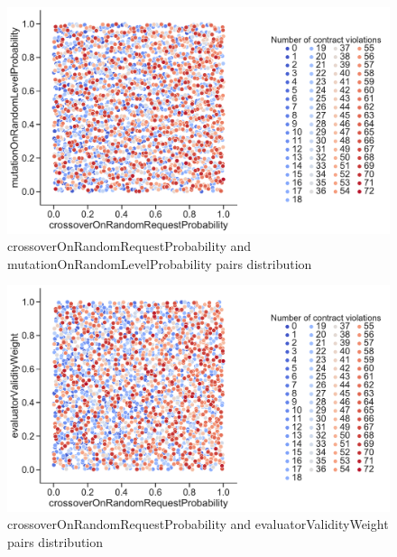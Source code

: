 \begin{figure}
	\centering
	\includegraphics[width=\textwidth]{images/PairsDistr/crossoverOnRandomRequestProbability_mutationOnRandomLevelProbability.pdf}
	\caption[crossoverOnRandomRequestProbability and mutationOnRandomLevelProbability pairs distribution]{crossoverOnRandomRequestProbability and mutationOnRandomLevelProbability pairs distribution}
	\label{fig:crossoverOnRandomRequestProbability_mutationOnRandomLevelProbability_pair}
\end{figure}
\begin{figure}
	\centering
	\includegraphics[width=\textwidth]{images/PairsDistr/crossoverOnRandomRequestProbability_evaluatorValidityWeight.pdf}
	\caption[crossoverOnRandomRequestProbability and evaluatorValidityWeight pairs distribution]{crossoverOnRandomRequestProbability and evaluatorValidityWeight pairs distribution}
	\label{fig:crossoverOnRandomRequestProbability_evaluatorValidityWeight_pair}
\end{figure}
